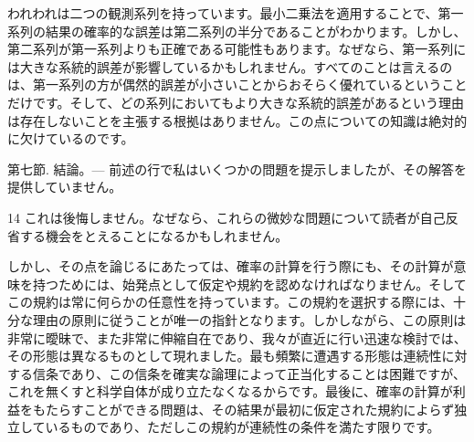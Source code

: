 \documentclass[a4paper,11pt,openany]{ltjsbook}
\begin{document}
われわれは二つの観測系列を持っています。最小二乗法を適用することで、第一系列の結果の確率的な誤差は第二系列の半分であることがわかります。しかし、第二系列が第一系列よりも正確である可能性もあります。なぜなら、第一系列には大きな系統的誤差が影響しているかもしれません。すべてのことは言えるのは、第一系列の方が偶然的誤差が小さいことからおそらく優れているということだけです。そして、どの系列においてもより大きな系統的誤差があるという理由は存在しないことを主張する根拠はありません。この点についての知識は絶対的に欠けているのです。

第七節. 結論。— 前述の行で私はいくつかの問題を提示しましたが、その解答を提供していません。

14 これは後悔しません。なぜなら、これらの微妙な問題について読者が自己反省する機会をとえることになるかもしれません。

しかし、その点を論じるにあたっては、確率の計算を行う際にも、その計算が意味を持つためには、始発点として仮定や規約を認めなければなりません。そしてこの規約は常に何らかの任意性を持っています。この規約を選択する際には、十分な理由の原則に従うことが唯一の指針となります。しかしながら、この原則は非常に曖昧で、また非常に伸縮自在であり、我々が直近に行い迅速な検討では、その形態は異なるものとして現れました。最も頻繁に遭遇する形態は連続性に対する信条であり、この信条を確実な論理によって正当化することは困難ですが、これを無くすと科学自体が成り立たなくなるからです。最後に、確率の計算が利益をもたらすことができる問題は、その結果が最初に仮定された規約によらず独立しているものであり、ただしこの規約が連続性の条件を満たす限りです。
\end{document}
